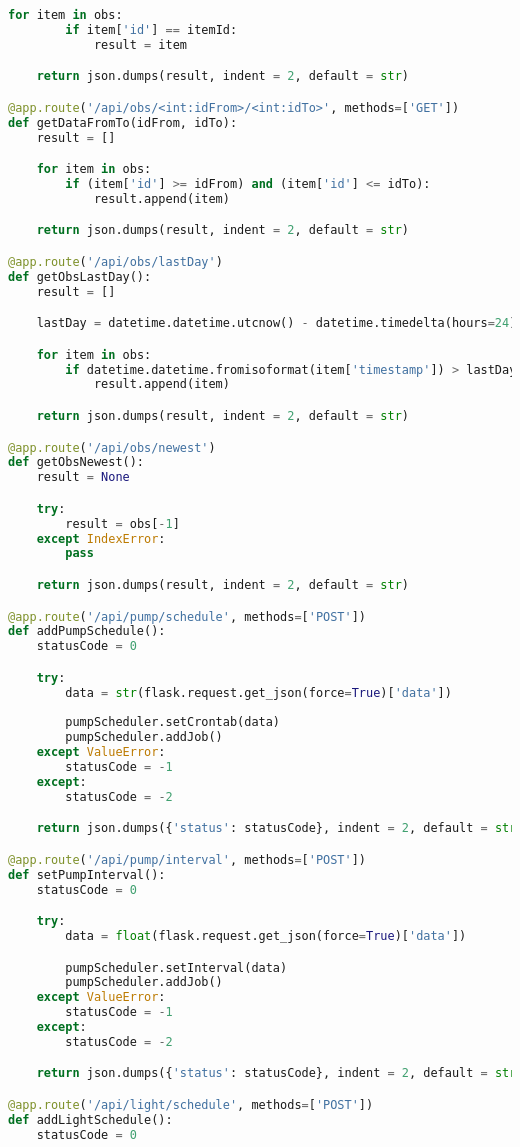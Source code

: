 \documentclass[a4paper,12pt,twoside,openright,titlepage]{book}
\begin{document}
\begin{lstlisting}[title={raspberrypi/api/data.py}, language=Python]
    for item in obs:
        if item['id'] == itemId:
            result = item

    return json.dumps(result, indent = 2, default = str)

@app.route('/api/obs/<int:idFrom>/<int:idTo>', methods=['GET'])
def getDataFromTo(idFrom, idTo):
    result = []

    for item in obs:
        if (item['id'] >= idFrom) and (item['id'] <= idTo):
            result.append(item)

    return json.dumps(result, indent = 2, default = str)

@app.route('/api/obs/lastDay')
def getObsLastDay():
    result = []

    lastDay = datetime.datetime.utcnow() - datetime.timedelta(hours=24)

    for item in obs:
        if datetime.datetime.fromisoformat(item['timestamp']) > lastDay:
            result.append(item)

    return json.dumps(result, indent = 2, default = str)

@app.route('/api/obs/newest')
def getObsNewest():
    result = None

    try:
        result = obs[-1]
    except IndexError:
        pass

    return json.dumps(result, indent = 2, default = str)

@app.route('/api/pump/schedule', methods=['POST'])
def addPumpSchedule():
    statusCode = 0

    try:
        data = str(flask.request.get_json(force=True)['data'])
        
        pumpScheduler.setCrontab(data)
        pumpScheduler.addJob()
    except ValueError:
        statusCode = -1
    except:
        statusCode = -2

    return json.dumps({'status': statusCode}, indent = 2, default = str)

@app.route('/api/pump/interval', methods=['POST'])
def setPumpInterval():
    statusCode = 0

    try:
        data = float(flask.request.get_json(force=True)['data'])

        pumpScheduler.setInterval(data)
        pumpScheduler.addJob()
    except ValueError:
        statusCode = -1
    except:
        statusCode = -2

    return json.dumps({'status': statusCode}, indent = 2, default = str)

@app.route('/api/light/schedule', methods=['POST'])
def addLightSchedule():
    statusCode = 0


\end{lstlisting}
\end{document}
